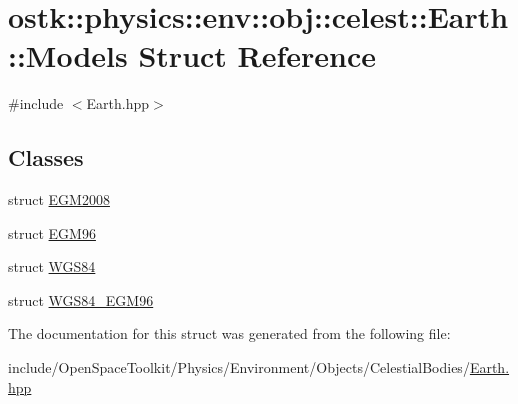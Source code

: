\hypertarget{structostk_1_1physics_1_1env_1_1obj_1_1celest_1_1_earth_1_1_models}{}\section{ostk\+:\+:physics\+:\+:env\+:\+:obj\+:\+:celest\+:\+:Earth\+:\+:Models Struct Reference}
\label{structostk_1_1physics_1_1env_1_1obj_1_1celest_1_1_earth_1_1_models}


{\ttfamily \#include $<$Earth.\+hpp$>$}

\subsection*{Classes}
\begin{DoxyCompactItemize}
\item 
struct \hyperlink{structostk_1_1physics_1_1env_1_1obj_1_1celest_1_1_earth_1_1_models_1_1_e_g_m2008}{E\+G\+M2008}
\item 
struct \hyperlink{structostk_1_1physics_1_1env_1_1obj_1_1celest_1_1_earth_1_1_models_1_1_e_g_m96}{E\+G\+M96}
\item 
struct \hyperlink{structostk_1_1physics_1_1env_1_1obj_1_1celest_1_1_earth_1_1_models_1_1_w_g_s84}{W\+G\+S84}
\item 
struct \hyperlink{structostk_1_1physics_1_1env_1_1obj_1_1celest_1_1_earth_1_1_models_1_1_w_g_s84___e_g_m96}{W\+G\+S84\+\_\+\+E\+G\+M96}
\end{DoxyCompactItemize}


The documentation for this struct was generated from the following file\+:\begin{DoxyCompactItemize}
\item 
include/\+Open\+Space\+Toolkit/\+Physics/\+Environment/\+Objects/\+Celestial\+Bodies/\hyperlink{_objects_2_celestial_bodies_2_earth_8hpp}{Earth.\+hpp}\end{DoxyCompactItemize}
